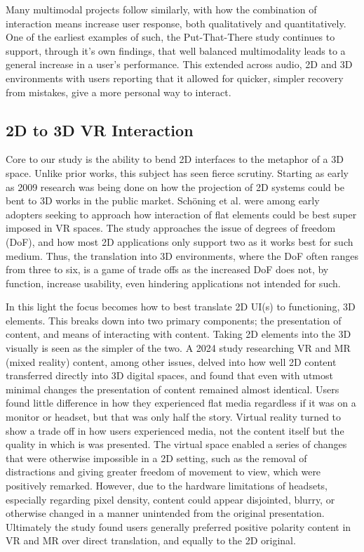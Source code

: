 \documentclass[manuscript, review]{acmart}
\begin{document}
Many multimodal projects follow similarly, with how the combination of interaction means increase user response, both qualitatively and quantitatively. One of the earliest examples of such, the Put-That-There study \cite{cdi_proquest_ebookcentralchapters_5927840_6_21} continues to support, through it’s own findings, that well balanced multimodality leads to a general increase in a user’s performance. This extended across audio, 2D and 3D environments with users reporting that it allowed for quicker, simpler recovery from mistakes, give a more personal way to interact.

\subsection{2D to 3D VR Interaction}

Core to our study is the ability to bend 2D interfaces to the metaphor of a 3D space. Unlike prior works, this subject has seen fierce scrutiny. Starting as early as 2009 research was being done on how the projection of 2D systems could be bent to 3D works in the public market. Schöning et al. \cite{SchoningJohannes2009BIwI} were among early adopters seeking to approach how interaction of flat elements could be best super imposed in VR spaces. The study approaches the issue of degrees of freedom (DoF), and how most 2D applications only support two as it works best for such medium. Thus, the translation into 3D environments, where the DoF often ranges from three to six, is a game of trade offs as the increased DoF does not, by function, increase usability, even hindering applications not intended for such.

In this light the focus becomes how to best translate 2D UI(s) to functioning, 3D elements. This breaks down into two primary components; the presentation of content, and means of interacting with content. Taking 2D elements into the 3D visually is seen as the simpler of the two. A 2024 study \cite{LuzsaRobert2026Tpei} researching VR and MR (mixed reality) content, among other issues, delved into how well 2D content transferred directly into 3D digital spaces, and found that even with utmost minimal changes the presentation of content remained almost identical. Users found little difference in how they experienced flat media regardless if it was on a monitor or headset, but that was only half the story. Virtual reality turned to show a trade off in how users experienced media, not the content itself but the quality in which is was presented. The virtual space enabled a series of changes that were otherwise impossible in a 2D setting, such as the removal of distractions and giving greater freedom of movement to view, which were positively remarked. However, due to the hardware limitations of headsets, especially regarding pixel density, content could appear disjointed, blurry, or otherwise changed in a manner unintended from the original presentation. Ultimately the study found users generally preferred positive polarity content in VR and MR over direct translation, and equally to the 2D original.
\end{document}

